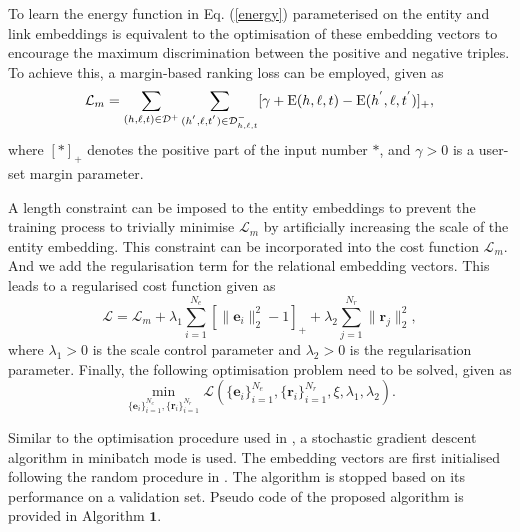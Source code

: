 \documentclass[9pt]{sig-alternate-05-2015}
\begin{document}
To learn the energy function in Eq. (\ref{energy}) parameterised on the entity and link embeddings is equivalent to the optimisation of these embedding vectors to encourage the maximum discrimination between  the positive  and negative triples. To achieve this, a margin-based ranking loss can be employed, given as
\begin{equation} \label{loss}
\small
\mathcal{L}_m = \sum_{(h,\ell,t)\in \mathcal{D}^+} \sum_{(h^{'},\ell,t^{'})\in  \mathcal{D}^{-}_{h,\ell,t}} [\gamma + \mathrm{E}(h,\ell,t)- \mathrm{E}(h^{'},\ell,t^{'}) ]_+,
\end{equation}
where $[*]_+$ denotes the positive part of the input number $*$, and $\gamma > 0$ is a user-set margin parameter.

A length constraint can be imposed to the entity embeddings to prevent the training process to trivially minimise $\mathcal{L}_m$ by artificially increasing the scale of the entity embedding. This constraint can be incorporated into the cost function $\mathcal{L}_m$.  And we add the regularisation term  for the relational embedding vectors. This leads to a regularised cost function given as
\begin{equation} \label{loss2}
\mathcal{L} = \mathcal{L}_m  +\lambda_1 \sum_{i =1}^{N_e} \left[\|\bm{e}_i\|_2^2 - 1\right]_+ + \lambda_2 \sum_{j=1}^{N_r} \| \bm{r}_{j} \|_2^2,
\end{equation}
where $\lambda_1>0$ is the scale control parameter and $\lambda_2 >0$ is the regularisation parameter. Finally, the  following optimisation problem need to be solved, given as
\begin{equation}
\min_{\{\bm e_i\}_{i=1}^{N_e}, \{\bm r_i\}_{i=1}^{N_r}} \mathcal{L}\left(\{\bm e_i\}_{i=1}^{N_e}, \{\bm r_i\}_{i=1}^{N_r}, \xi,\lambda_1, \lambda_2 \right).
\end{equation}

Similar to the optimisation procedure used in \cite{bordes_translating_2013}, a stochastic gradient descent algorithm in minibatch mode is used. The embedding vectors are first initialised following the random procedure in \cite{glorot_understanding_2010}. The algorithm is stopped based on its performance on a validation set.  Pseudo code of the proposed algorithm is provided in Algorithm $\textbf{1}$.
\end{document}
